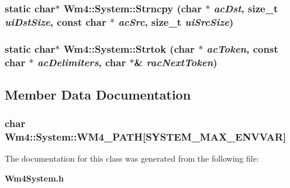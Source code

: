 \subsubsection{\setlength{\rightskip}{0pt plus 5cm}static char$\ast$ Wm4::System::Strncpy (char $\ast$ {\em ac\-Dst}, size\_\-t {\em ui\-Dst\-Size}, const char $\ast$ {\em ac\-Src}, size\_\-t {\em ui\-Src\-Size})\hspace{0.3cm}{\tt  [static]}}\label{classWm4_1_1System_662413b41fda59780384142ed6cbb7a0}


\subsubsection{\setlength{\rightskip}{0pt plus 5cm}static char$\ast$ Wm4::System::Strtok (char $\ast$ {\em ac\-Token}, const char $\ast$ {\em ac\-Delimiters}, char $\ast$\& {\em rac\-Next\-Token})\hspace{0.3cm}{\tt  [static]}}\label{classWm4_1_1System_323f5f05e9ec0049dbbbb88563bb99c5}




\subsection{Member Data Documentation}
\subsubsection{\setlength{\rightskip}{0pt plus 5cm}char {\bf Wm4::System::WM4\_\-PATH}[SYSTEM\_\-MAX\_\-ENVVAR]\hspace{0.3cm}{\tt  [static]}}\label{classWm4_1_1System_6e4be2e9fe8a82484d1090f5ef9d06cb}




The documentation for this class was generated from the following file:\begin{CompactItemize}
\item 
{\bf Wm4System.h}\end{CompactItemize}
